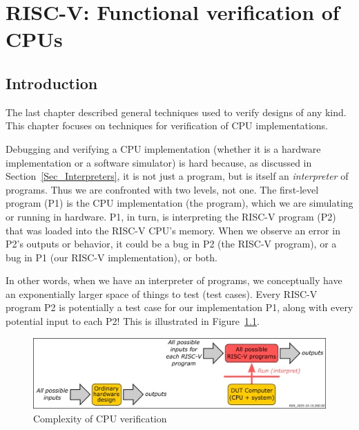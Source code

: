 

\chapter{RISC-V: Functional verification of CPUs}


\setcounter{page}{1}
\renewcommand{\thepage}{\arabic{chapter}-\arabic{page}}

\label{ch_RISCV_verification}


\section{Introduction}

\label{Sec_RISCV_verification_intro}

The last chapter described general techniques used to verify {\BSV}
designs of any kind.  This chapter focuses on techniques for
verification of CPU implementations.

Debugging and verifying a CPU implementation (whether it is a hardware
implementation or a software simulator) is hard because, as discussed
in Section~\ref{Sec_Interpreters}, it is not just a program, but is
itself an \emph{interpreter} of programs.  Thus we are confronted with
two levels, not one.  The first-level program (P1) is the CPU
implementation (the {\BSV} program), which we are simulating or running
in hardware.  P1, in turn, is interpreting the RISC-V program (P2)
that was loaded into the RISC-V CPU's memory. When we observe an error
in P2's outputs or behavior, it could be a bug in P2 (the RISC-V
program), or a bug in P1 (our RISC-V implementation), or both.

In other words, when we have an interpreter of programs, we
conceptually have an exponentially larger space of things to test
(test cases).  Every RISC-V program P2 is potentially a test case for
our implementation P1, along with every potential input to each P2!
This is illustrated in Figure~\ref{Fig_CPU_Verif_Complexity}.
\begin{figure}[htbp]
  \centerline{\includegraphics[width=6in,angle=0]
                              {Figures/RSN_2025-10-15.000.00_CPU_Verif_Complexity}}
  \caption{\label{Fig_CPU_Verif_Complexity}
           Complexity of CPU verification}
\end{figure}

